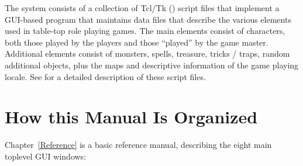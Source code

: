 The system consists of a collection of Tcl/Tk (\cite{Ousterhout94})
script files that implement a GUI-based program that maintains data
files that describe the various elements used in table-top
role playing games. The main elements consist of characters, both those
played by the players and those ``played'' by the game master.
Additional elements consist of monsters, spells, treasure, tricks /
traps, random additional objects, plus the maps and descriptive
information of the game playing locale.  See \cite{HellerRPGTcl09} for a
detailed description of these script files.

\section{How this Manual Is Organized}

Chapter~\ref{Reference} is a basic reference manual, describing the
eight main toplevel GUI windows:

